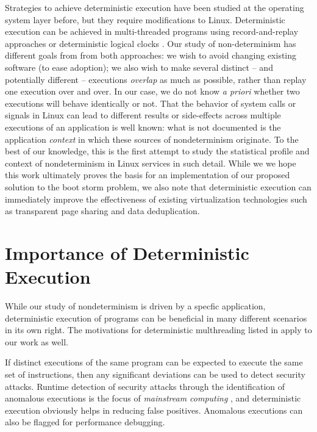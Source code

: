 Strategies to achieve deterministic execution have been studied at the operating system layer \cite{bergan2010dos} before,
but they require modifications to Linux. Deterministic execution can be achieved in multi-threaded programs 
using record-and-replay approaches \cite{patil2010pinplay} or deterministic logical clocks \cite{marek2011scaling}. 
Our study of non-determinism has different goals from from both approaches: we wish to avoid changing existing 
software (to ease adoption); we also wish to make several distinct -- and potentially different -- executions \emph{overlap} as much as possible, 
rather than replay one execution over and over. In our case, we do not know \emph{a priori} whether two executions 
will behave identically or not. That the behavior of system calls or signals in Linux can lead to different results or side-effects across
multiple executions of an application is well known: what is not documented is the application \emph{context} in
which these sources of nondeterminism originate. To the best of our knowledge, this is
the first attempt to study the statistical profile and context of nondeterminism in Linux services
in such detail. While we we hope
this work ultimately proves the basis for an implementation of our proposed solution to the boot storm
problem, we also note that deterministic execution can immediately improve
the effectiveness of existing virtualization technologies such as transparent page sharing
and data deduplication.

\section{Importance of Deterministic Execution}
While our study of nondeterminism is driven by a specfic application,
 deterministic execution of programs can be beneficial in many
different scenarios in its own right. 
The motivations for deterministic multhreading listed in
\cite{marek2011scaling, patil2010pinplay} apply to our work as well. \newline

If distinct executions of the same program can be
expected to execute the same set of instructions, then
any significant deviations can be used to detect security
attacks. Runtime detection of security attacks through the
identification of anomalous executions is the focus of \emph{mainstream computing} \cite{stephenson2010mainstream},
and deterministic execution obviously helps in reducing false
positives. 
Anomalous executions can also be flagged for performance
debugging. \newline

